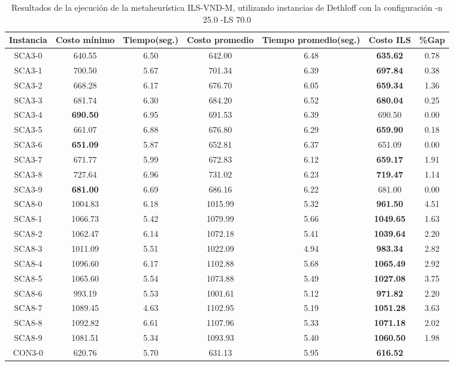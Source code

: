 \begin{table}[h]
\caption{Resultados de la ejecución de la metaheurística ILS-VND-M, utilizando instancias de Dethloff con la configuración -n 25.0 -LS 70.0}
\centering
\small
\begin{tabular}{c c c c c c c}
\hline\hline
Instancia & Costo mínimo & Tiempo(seg.) & Costo promedio & Tiempo promedio(seg.) & Costo ILS & \%Gap \\ [0.5ex]
\hline
SCA3-0 & 640.55 & 6.50 & 
642.00 & 6.48 & \bf{635.62} & 
0.78\\SCA3-1 & 700.50 & 5.67 & 
701.34 & 6.39 & \bf{697.84} & 
0.38\\SCA3-2 & 668.28 & 6.17 & 
676.70 & 6.05 & \bf{659.34} & 
1.36\\SCA3-3 & 681.74 & 6.30 & 
684.20 & 6.52 & \bf{680.04} & 
0.25\\SCA3-4 & \bf{690.50} & 6.95 & 
691.53 & 6.39 & 690.50 & 0.00\\
SCA3-5 & 661.07 & 6.88 & 
676.80 & 6.29 & \bf{659.90} & 
0.18\\SCA3-6 & \bf{651.09} & 5.87 & 
652.81 & 6.37 & 651.09 & 0.00\\
SCA3-7 & 671.77 & 5.99 & 
672.83 & 6.12 & \bf{659.17} & 
1.91\\SCA3-8 & 727.64 & 6.96 & 
731.02 & 6.23 & \bf{719.47} & 
1.14\\SCA3-9 & \bf{681.00} & 6.69 & 
686.16 & 6.22 & 681.00 & 0.00\\
SCA8-0 & 1004.83 & 6.18 & 
1015.99 & 5.32 & \bf{961.50} & 
4.51\\SCA8-1 & 1066.73 & 5.42 & 
1079.99 & 5.66 & \bf{1049.65} & 
1.63\\SCA8-2 & 1062.47 & 6.14 & 
1072.18 & 5.41 & \bf{1039.64} & 
2.20\\SCA8-3 & 1011.09 & 5.51 & 
1022.09 & 4.94 & \bf{983.34} & 
2.82\\SCA8-4 & 1096.60 & 6.17 & 
1102.88 & 5.68 & \bf{1065.49} & 
2.92\\SCA8-5 & 1065.60 & 5.54 & 
1073.88 & 5.49 & \bf{1027.08} & 
3.75\\SCA8-6 & 993.19 & 5.53 & 
1001.61 & 5.12 & \bf{971.82} & 
2.20\\SCA8-7 & 1089.45 & 4.63 & 
1102.95 & 5.19 & \bf{1051.28} & 
3.63\\SCA8-8 & 1092.82 & 6.61 & 
1107.96 & 5.33 & \bf{1071.18} & 
2.02\\SCA8-9 & 1081.51 & 5.34 & 
1093.93 & 5.40 & \bf{1060.50} & 
1.98\\CON3-0 & 620.76 & 5.70 & 
631.13 & 5.95 & \bf{616.52} & 

\end{tabular}
\end{table}

